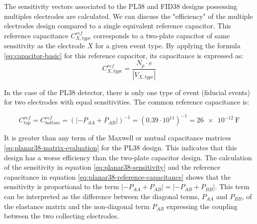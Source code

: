 
The sensitivity vectors associated to the PL38 and FID38 designs possessing multiples electrodes are calculated. We can discuss the "efficiency" of the multiple electrodes design compared to a single equivalent reference capacitor. This reference capacitance $C_{X, type}^{ref}$ corresponds to a two-plate capacitor of same sensitivity as the electrode $X$ for a given event type. By applying the formula \ref{eq:capacitor-basic} for this reference capacitor, its capacitance is expressed as:
\begin{equation}
C_{X,type}^{ref} = \frac{N_p \cdot e}{| V_{X,type} |}
\end{equation}

%

In the case of the PL38 detector, there is only one type of event (fiducial events) for two electrodes with equal sensitivities. The common reference capacitance is:

\begin{equation}
\label{eq:planar38-reference-capacitance}
C_{top}^{ref}
= C_{bottom}^{ref}
= \left( | -P_{AA} + P_{AB} |\right)^{-1}
= (0.39 \cdot 10^{11})^{-1}
= \SI{26e-12}{\farad}
\end{equation}

It is greater than any term of the Maxwell or mutual capacitance matrices \ref{eq:planar38-matrix-evaluation} for the PL38 design. This indicates that this design has a worse efficiency than the two-plate capacitor design. The calculation of the sensitivity in equation \ref{eq:planar38-sensitivity} and the reference capacitance in equation \ref{eq:planar38-reference-capacitance} shows that the sensitivity is proportional to the term $| -P_{AA} + P_{AB} | = | -P_{AB} + P_{BB} |$. This term can be interpreted as the difference between the diagonal terms, $P_{AA}$ and $P_{BB}$, of the elastance matrix and the non-diagonal term $P_{AB}$ expressing the coupling between the two collecting electrodes.

